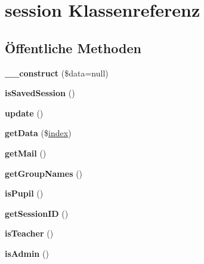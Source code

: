 \hypertarget{classsession}{}\section{session Klassenreferenz}
\label{classsession}
\subsection*{Öffentliche Methoden}
\begin{DoxyCompactItemize}
\item 
\mbox{\label{classsession_a53e60d30087fa68de68145e56f7abb83}} 
{\bfseries \+\_\+\+\_\+construct} (\$data=null)
\item 
\mbox{\label{classsession_a779a8ed91035ec5a45323e0c45796e6e}} 
{\bfseries is\+Saved\+Session} ()
\item 
\mbox{\label{classsession_afd60509b97f5e00e7524000e4aa8454b}} 
{\bfseries update} ()
\item 
\mbox{\label{classsession_aeda162665997d99c13d781c8fef71f2d}} 
{\bfseries get\+Data} (\$\mbox{\hyperlink{classindex}{index}})
\item 
\mbox{\label{classsession_aa01cd9ed23fdff2e86932fab4f1aadcf}} 
{\bfseries get\+Mail} ()
\item 
\mbox{\label{classsession_abade6f332be8877a6b22ba47a9d5716c}} 
{\bfseries get\+Group\+Names} ()
\item 
\mbox{\label{classsession_ad046c1859487ea93b5ba0052d310457b}} 
{\bfseries is\+Pupil} ()
\item 
\mbox{\label{classsession_ae03aa5001f4660a216847dc302095821}} 
{\bfseries get\+Session\+ID} ()
\item 
\mbox{\label{classsession_aea8c24e4546eccff2c0448675d9a8f2d}} 
{\bfseries is\+Teacher} ()
\item 
\mbox{\label{classsession_a0e69a484da9dd2f395c85fbaa19a65de}} 
{\bfseries is\+Admin} ()
\item 

\end{DoxyCompactItemize}
